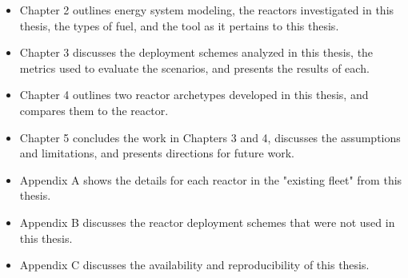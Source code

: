 \begin{itemize}
    \item Chapter 2 outlines energy system modeling, the reactors investigated in this thesis, the types of fuel, and the \cyclus tool as it pertains to this thesis.
    \item Chapter 3 discusses the deployment schemes analyzed in this thesis, the metrics used to evaluate the scenarios, and presents the results of each.
    \item Chapter 4 outlines two reactor archetypes developed in this thesis, and compares them to the \cycamore reactor.
    \item Chapter 5 concludes the work in Chapters 3 and 4, discusses the assumptions and limitations, and presents directions for future work.
    \item Appendix A shows the details for each reactor in the "existing fleet" from this thesis.
    \item Appendix B discusses the reactor deployment schemes that were not used in this thesis.
    \item Appendix C discusses the availability and reproducibility of this thesis.
\end{itemize}